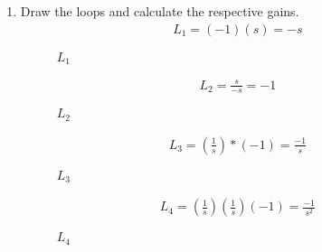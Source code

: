\begin{enumerate}[label=\thesection.\arabic*.,ref=\thesection.\theenumi]
\item Draw the loops and calculate the respective gains.\renewcommand{\thefigure}{\theenumi.\arabic{figure}}
\\
\solution 
\begin{align}
L_1=(-1)(s)=-s
\end{align}

\begin{figure}[!ht]
\begin{center}
		
		\resizebox{\columnwidth}{!}{}
	\end{center}
\caption{$L_1$}
\label{fig:sec_order}
\end{figure}


\begin{align}
L_2=\frac{s}{-s}=-1
\end{align}

\begin{figure}[!ht]
\begin{center}
		
		\resizebox{\columnwidth}{!}{}
	\end{center}
\caption{$L_2$}
\label{fig:sec_order}
\end{figure}


\begin{align}
L_3=(\frac{1}{s})*(-1)=\frac{-1}{s}
\end{align}

\begin{figure}[!ht]
\begin{center}
		
		\resizebox{\columnwidth}{!}{}
	\end{center}
\caption{$L_3$}
\label{fig:sec_order}
\end{figure}


\begin{align}
L_4=(\frac{1}{s})(\frac{1}{s})(-1)=\frac{-1}{s^2}
\end{align}

\begin{figure}[!ht]
\begin{center}
		
		\resizebox{\columnwidth}{!}{}
	\end{center}
\caption{$L_4$}
\label{fig:sec_order}
\end{figure}

\renewcommand{\thefigure}{\theenumi}


\end{enumerate}

